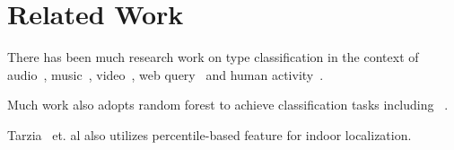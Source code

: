 \section{Related Work}
There has been much research work on type classification in the context of audio~\cite{audio1,audio2}, music~\cite{music1,music2}, video~\cite{video1,video2}, web query~\cite{query1,query2} and human activity~\cite{activity1, activity2}.

Much work also adopts random forest to achieve classification tasks including ~\cite{RF1,RF2,RF3,cvpr}.

Tarzia~\cite{ABS} et. al also utilizes percentile-based feature for indoor localization.
